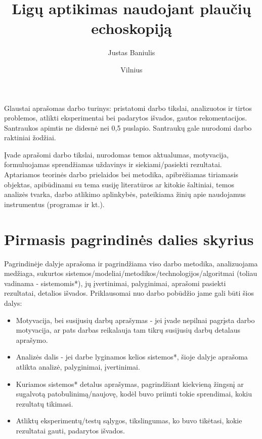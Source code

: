 \documentclass[fleqn]{VUMIFKompMagistrinis}
\institute{Informatikos institutas}  %
\title{Ligų aptikimas naudojant plaučių echoskopiją}
\author{Justas Baniulis}
\date{Vilnius \\ \the\year}
\begin{document}
\maketitle

\tableofcontents

Glaustai aprašomas darbo turinys: pristatomi darbo tikslai, analizuotos ir
tirtos problemos, atlikti eksperimentai bei padarytos išvados, gautos
rekomentacijos. Santraukos apimtis ne didesnė nei 0,5 puslapio. Santraukų gale
nurodomi darbo raktiniai žodžiai. 



Įvade aprašomi darbo tikslai, nurodomas temos aktualumas, motyvacija,
formuluojamas sprendžiamas uždavinys ir siekiami/pasiekti rezultatai.
Aptariamos teorinės darbo prielaidos bei metodika, apibrėžiamas tiriamasis
objektas, apibūdinami su tema susiję literatūros ar kitokie šaltiniai, temos
analizės tvarka, darbo atlikimo aplinkybės, pateikiama žinių apie naudojamus
instrumentus (programas ir kt.).

\section{Pirmasis pagrindinės dalies skyrius}
Pagrindinėje dalyje aprašoma ir pagrindžiama viso darbo metodika, analizuojama
medžiaga, sukurtos sistemos/modeliai/metodikos/technologijos/algoritmai (toliau
vadinama - sistemomis*), jų įvertinimai, palyginimai, aprašomi pasiekti
rezultatai, detalios išvados. Priklausomai nuo darbo pobūdžio jame gali būti
šios dalys:
\begin{itemize}
    \item Motyvacija, bei susijusių darbų aprašymas - jei įvade nepilnai
        pagrįsta darbo motyvacija, ar pats darbas reikalauja tam tikrų
        susijusių darbų detalaus aprašymo.
    \item Analizės dalis - jei darbe lyginamos kelios sistemos*, šioje dalyje
        aprašoma atlikta analizė, palyginimai, įvertinimai.
    \item Kuriamos sistemos* detalus aprašymas, pagrindžiant kiekvieną žingsnį
        ar sugalvotą patobulinimą/naujovę, kodėl buvo priimti tokie sprendimai,
        kokiu rezultatų tikimasi.
    \item Atliktų eksperimentų/testų sąlygos, tikslingumas, ko buvo tikėtasi,
        kokie rezultatai gauti, padarytos išvados.
\end{itemize}
\end{document}

